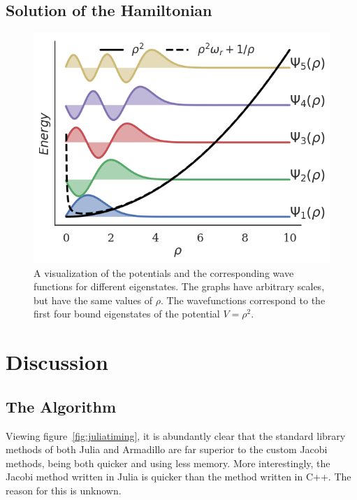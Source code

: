 \documentclass[aps,reprint]{revtex4-1}
\begin{document}
\subsection{Solution of the Hamiltonian}
\label{sec:hamiltonsol}

\begin{figure}[ht]
  \centering
  \includegraphics[width=\columnwidth]{figures/wavefunctions.png}
  \caption{\label{fig:wavefunctions} A visualization of the potentials and the
    corresponding wave functions for different eigenstates. The graphs have
    arbitrary scales, but have the same values of \(\rho\). The wavefunctions
    correspond to
    the first four bound eigenstates of the potential \(V=\rho^{2}\).}
\end{figure}



\section{Discussion}

\subsection{The Algorithm}
Viewing figure~\ref{fig:juliatiming}, it is abundantly clear that the standard
library methods of both Julia and Armadillo are far superior to the custom
Jacobi methods, being both quicker and using less memory. More interestingly,
the Jacobi method written in Julia is quicker than the method written in C++.
The reason for this is unknown.
\end{document}
